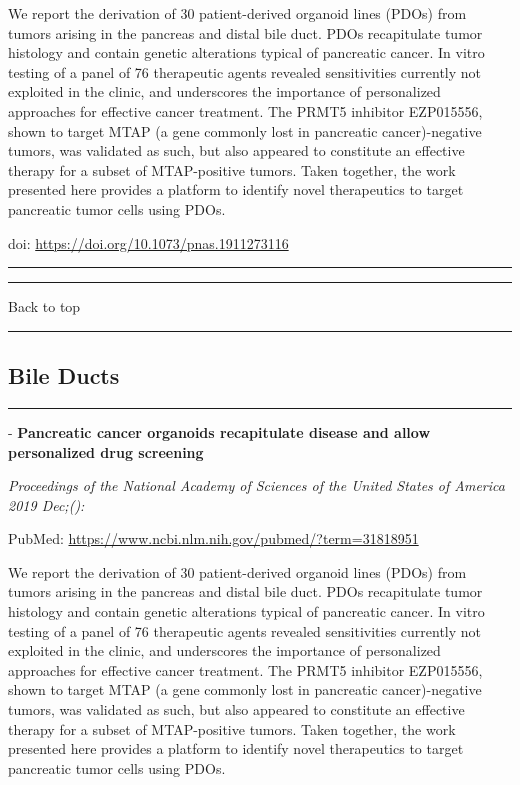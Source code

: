 \documentclass[
]{article}
\renewcommand{\linethickness}{0.05em}
\begin{document}
We report the derivation of 30 patient-derived organoid lines (PDOs)
from tumors arising in the pancreas and distal bile duct. PDOs
recapitulate tumor histology and contain genetic alterations typical of
pancreatic cancer. In vitro testing of a panel of 76 therapeutic agents
revealed sensitivities currently not exploited in the clinic, and
underscores the importance of personalized approaches for effective
cancer treatment. The PRMT5 inhibitor EZP015556, shown to target MTAP (a
gene commonly lost in pancreatic cancer)-negative tumors, was validated
as such, but also appeared to constitute an effective therapy for a
subset of MTAP-positive tumors. Taken together, the work presented here
provides a platform to identify novel therapeutics to target pancreatic
tumor cells using PDOs.

doi: \url{https://doi.org/10.1073/pnas.1911273116}

\begin{center}\rule{0.5\linewidth}{\linethickness}\end{center}

\begin{center}\rule{0.5\linewidth}{\linethickness}\end{center}

Back to top

\begin{center}\rule{0.5\linewidth}{\linethickness}\end{center}

\pagebreak

\hypertarget{bileducts}{%
\subsection{Bile Ducts}\label{bileducts}}

\begin{center}\rule{0.5\linewidth}{\linethickness}\end{center}

- \textbf{Pancreatic cancer organoids recapitulate disease and allow
personalized drug screening}

\emph{Proceedings of the National Academy of Sciences of the United
States of America 2019 Dec;():}

PubMed: \url{https://www.ncbi.nlm.nih.gov/pubmed/?term=31818951}

We report the derivation of 30 patient-derived organoid lines (PDOs)
from tumors arising in the pancreas and distal bile duct. PDOs
recapitulate tumor histology and contain genetic alterations typical of
pancreatic cancer. In vitro testing of a panel of 76 therapeutic agents
revealed sensitivities currently not exploited in the clinic, and
underscores the importance of personalized approaches for effective
cancer treatment. The PRMT5 inhibitor EZP015556, shown to target MTAP (a
gene commonly lost in pancreatic cancer)-negative tumors, was validated
as such, but also appeared to constitute an effective therapy for a
subset of MTAP-positive tumors. Taken together, the work presented here
provides a platform to identify novel therapeutics to target pancreatic
tumor cells using PDOs.
\end{document}
